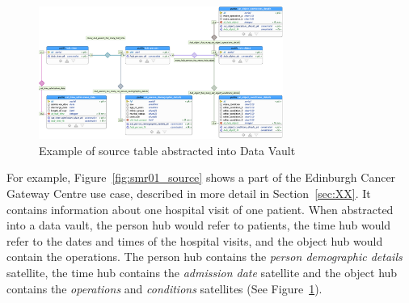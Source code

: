 \begin{figure}
    \centering
    \includegraphics[width=80mm]{images/DataVault/DataVault.pdf}
    \caption{Example of source table abstracted into Data Vault}
    \label{fig:dv_smr01}
\end{figure}

For example, Figure~\ref{fig:smr01_source} shows a part of the Edinburgh Cancer Gateway Centre use case, described in more detail in Section~\ref{sec:XX}. It contains information about one hospital visit of one patient. When abstracted into a data vault, the person hub would refer to patients, the time hub would refer to the dates and times of the hospital visits, and the object hub would contain the operations. The person hub contains the \emph{person demographic details} satellite, the time hub contains the \emph{admission date} satellite and the object hub contains the \emph{operations} and \emph{conditions} satellites (See Figure~\ref{fig:dv_smr01}). 





